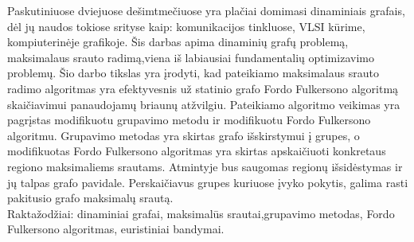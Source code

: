Paskutiniuose dviejuose dešimtmečiuose yra plačiai domimasi dinaminiais grafais, dėl jų naudos tokiose srityse kaip: komunikacijos tinkluose, VLSI kūrime, kompiuterinėje grafikoje. Šis darbas apima dinaminių grafų problemą, maksimalaus srauto radimą,viena iš labiausiai fundamentalių optimizavimo problemų. Šio darbo tikslas yra įrodyti, kad pateikiamo maksimalaus srauto radimo algoritmas yra efektyvesnis už statinio grafo Fordo Fulkersono algoritmą skaičiavimui panaudojamų briaunų atžvilgiu. Pateikiamo algoritmo veikimas yra pagrįstas modifikuotu grupavimo metodu ir modifikuotu Fordo Fulkersono algoritmu. Grupavimo metodas yra skirtas grafo išskirstymui į grupes, o modifikuotas Fordo Fulkersono algoritmas yra skirtas apskaičiuoti konkretaus regiono maksimaliems srautams. Atmintyje bus saugomas regionų išsidėstymas ir jų talpas grafo pavidale. Perskaičiavus grupes kuriuose įvyko pokytis, galima rasti pakitusio grafo maksimalų srautą. \\
Raktažodžiai: dinaminiai grafai, maksimalūs srautai,grupavimo metodas, Fordo Fulkersono algoritmas, euristiniai bandymai.